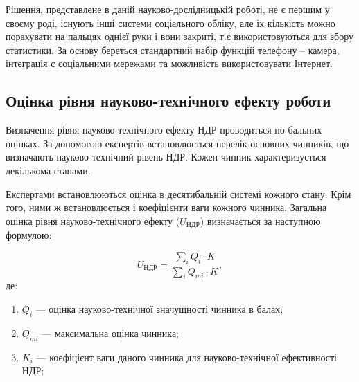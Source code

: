 Рішення, представлене в даній науково-дослідницькій роботі, не є першим у своєму роді, існують інші системи соціального обліку, але іх кількість можно порахувати на пальцях однієї руки і вони закриті, т.є використовуються для збору статистики. За основу береться стандартний набір функцій телефону – камера, інтеграція с соціальними мережами та можливість використовувати Інтернет.
    \subsection{Оцінка рівня науково-технічного ефекту роботи}
Визначення рівня науково-технічного ефекту НДР проводиться по бальних оцінках. За допомогою експертів встановлюється перелік основних чинників, що визначають науково-технічний рівень НДР. Кожен чинник характеризується декількома станами.

Експертами встановлюються оцінка в десятибальній системі кожного стану. Крім того, ними ж встановлюється і коефіцієнти ваги кожного чинника. Загальна оцінка рівня науково-технічного ефекту ($U_{\text{НДР}}$) визначається за наступною формулою:
 
\begin{equation}
U_{\text{НДР}} =  \frac{\sum \limits_{i} Q_i   \cdot   K}{\sum \limits_{i} Q_{mi}   \cdot   K}, \nonumber
\end{equation}
де:
\begin{enumerate} 
\item \mbox{$ Q_i $} --- оцінка науково-технічної значущності чинника в балах;
\item \mbox{$ Q_{mi} $} --- максимальна оцінка чинника;
\item \mbox{$ K_i $} --- коефіцієнт ваги даного чинника для науково-технічної ефективності НДР;
\end{enumerate}

